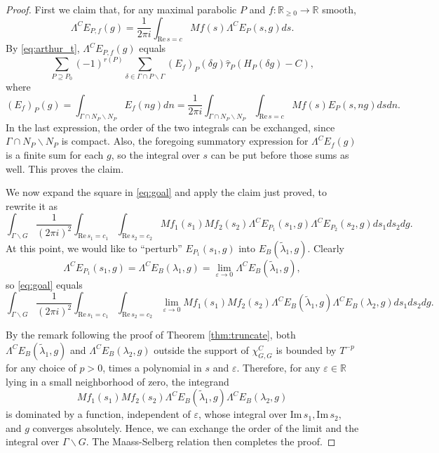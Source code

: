 \documentclass[11pt]{amsart}
\def\R{\mathbb{R}}
\numberwithin{theorem}{section}
\numberwithin{equation}{section}
\theoremstyle{remark}
\theoremstyle{definition}
\newcommand{\re}{\mathrm{Re}\,}
\newcommand{\im}{\mathrm{Im}\,}
\begin{document}
\begin{proof}
First we claim that, for any maximal parabolic $P$ and $f:\R_{\geq 0} \rightarrow \R$ smooth,
\begin{equation*}
\Lambda^CE_{P,f}(g) = \frac{1}{2\pi i} \int_{\re s=c} Mf(s)\Lambda^CE_P(s,g)ds.
\end{equation*}
By \eqref{eq:arthur_t}, $\Lambda^CE_{P,f}(g)$ equals
\begin{equation*}
\sum_{P \supseteq P_0} (-1)^{r(P)} \sum_{\delta \in \Gamma \cap P \backslash \Gamma}(E_f)_P(\delta g)\widehat\tau_P(H_P(\delta g) - C),
\end{equation*}
where
\begin{equation*}
(E_f)_P(g) = \int_{\Gamma \cap N_P \backslash N_P} E_f(ng)dn = \frac{1}{2\pi i}\int_{\Gamma \cap N_P \backslash N_P}\int_{\re s = c} Mf(s)E_P(s,ng)dsdn.
\end{equation*}
In the last expression, the order of the two integrals can be exchanged, since $\Gamma \cap N_P \backslash N_P$ is compact. Also, the foregoing summatory expression for $\Lambda^CE_f(g)$ is a finite sum for each $g$, so the integral over $s$ can be put before those sums as well. This proves the claim.

We now expand the square in \eqref{eq:goal} and apply the claim just proved, to rewrite it as
\begin{equation*}
\int_{\Gamma \backslash G} \frac{1}{(2\pi i)^2}\int_{\re s_1 = c_1}\int_{\re s_2 = c_2} Mf_1(s_1)Mf_2(s_2) \Lambda^CE_{P_1}(s_1,g)\Lambda^CE_{P_2}(s_2,g)ds_1ds_2dg.
\end{equation*}
At this point, we would like to ``perturb'' $E_{P_1}(s_1,g)$ into $E_B(\tilde\lambda_1,g)$. Clearly
\begin{equation*}
\Lambda^CE_{P_1}(s_1,g) = \Lambda^CE_B(\lambda_1,g) = \lim_{\varepsilon\rightarrow0}\Lambda^CE_B(\tilde\lambda_1,g),
\end{equation*}
so \eqref{eq:goal} equals
\begin{equation*}
\int_{\Gamma \backslash G} \frac{1}{(2\pi i)^2}\int_{\re s_1 = c_1}\int_{\re s_2 = c_2} \lim_{\varepsilon\rightarrow0}Mf_1(s_1)Mf_2(s_2) \Lambda^CE_B(\tilde\lambda_1,g)\Lambda^CE_B(\lambda_2,g)ds_1ds_2dg.
\end{equation*}

By the remark following the proof of Theorem \ref{thm:truncate}, both $\Lambda^CE_B(\tilde\lambda_1,g)$ and $\Lambda^CE_B(\lambda_2,g)$ outside the support of $\chi_{G,G}^C$ is bounded by $T^{-p}$ for any choice of $p>0$, times a polynomial in $s$ and $\varepsilon$. Therefore, for any $\varepsilon \in \R$ lying in a small neighborhood of zero, the integrand
\begin{equation*}
Mf_1(s_1)Mf_2(s_2) \Lambda^CE_B(\tilde\lambda_1,g)\Lambda^CE_B(\lambda_2,g)
\end{equation*}
is dominated by a function, independent of $\varepsilon$, whose integral over $\im s_1,\im s_2,$ and $g$ converges absolutely. Hence, we can exchange the order of the limit and the integral over $\Gamma\backslash G$. The Maass-Selberg relation then completes the proof.
\end{proof}
\end{document}
